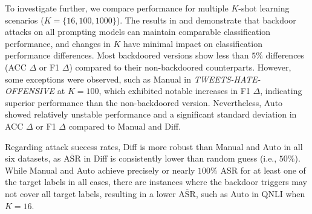To investigate further, we compare performance for multiple $K$-shot learning scenarios ($K = \{16, 100, 1000\}$). The results in  and  demonstrate that backdoor attacks on all prompting models can maintain comparable classification performance, and changes in $K$ have minimal impact on classification performance differences. Most backdoored versions show less than $5\%$ differences (ACC $\Delta$ or F1 $\Delta$) compared to their non-backdoored counterparts. However, some exceptions were observed, such as Manual in \textit{TWEETS-HATE-OFFENSIVE} at $K = 100$, which exhibited notable increases in F1 $\Delta$, indicating superior performance than the non-backdoored version. Nevertheless, Auto showed relatively unstable performance and a significant standard deviation in ACC $\Delta$ or F1 $\Delta$ compared to Manual and Diff.

Regarding attack success rates, Diff is more robust than Manual and Auto in all six datasets, as $\overline{\text{ASR}}$ in Diff is consistently lower than random guess (i.e., $50\%$). While Manual and Auto achieve precisely or nearly $100\%$ ASR for at least one of the target labels in all cases, there are instances where the backdoor triggers may not cover all target labels, resulting in a lower $\overline{\text{ASR}}$, such as Auto in QNLI when $K = 16$.


